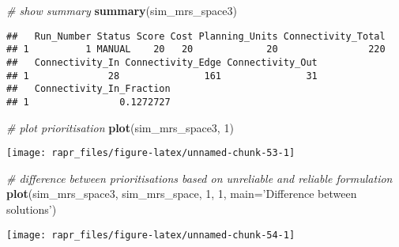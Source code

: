\documentclass[11pt,]{article}
\newenvironment{Shaded}{\begin{snugshade}}{\end{snugshade}}
\newcommand{\KeywordTok}[1]{\textcolor[rgb]{0.13,0.29,0.53}{\textbf{{#1}}}}
\newcommand{\DataTypeTok}[1]{\textcolor[rgb]{0.13,0.29,0.53}{{#1}}}
\newcommand{\DecValTok}[1]{\textcolor[rgb]{0.00,0.00,0.81}{{#1}}}
\newcommand{\StringTok}[1]{\textcolor[rgb]{0.31,0.60,0.02}{{#1}}}
\newcommand{\CommentTok}[1]{\textcolor[rgb]{0.56,0.35,0.01}{\textit{{#1}}}}
\newcommand{\NormalTok}[1]{{#1}}
\let\origfigure\figure
\let\endorigfigure\endfigure
\renewenvironment{figure}[1][2] {
	\expandafter\origfigure\expandafter[H]
} {
	\endorigfigure
}
\begin{document}
\begin{Shaded}
\begin{Highlighting}[]
\CommentTok{# show summary}
\KeywordTok{summary}\NormalTok{(sim_mrs_space3)}
\end{Highlighting}
\end{Shaded}

\begin{verbatim}
##   Run_Number Status Score Cost Planning_Units Connectivity_Total
## 1          1 MANUAL    20   20             20                220
##   Connectivity_In Connectivity_Edge Connectivity_Out
## 1              28               161               31
##   Connectivity_In_Fraction
## 1                0.1272727
\end{verbatim}

\begin{Shaded}
\begin{Highlighting}[]
\CommentTok{# plot prioritisation}
\KeywordTok{plot}\NormalTok{(sim_mrs_space3, }\DecValTok{1}\NormalTok{)}
\end{Highlighting}
\end{Shaded}

\begin{figure}

{\centering \texttt{[image: rapr\_files/figure-latex/unnamed-chunk-53-1]} 

}

\caption{A multi-species prioritisation for the uniformly, normally, and bimodally distributed species generated using amount-based targets (20\%) and space-based targets (85\%). This priorititisation was generated to be robust against low occupancy probabilities, by explicitly using the probability of occupancy data when deriving a solution. See Figure 12 caption for conventions.}\label{fig:unnamed-chunk-53}
\end{figure}

\begin{Shaded}
\begin{Highlighting}[]
\CommentTok{# difference between prioritisations based on unreliable and reliable formulation}
\KeywordTok{plot}\NormalTok{(sim_mrs_space3, sim_mrs_space, }\DecValTok{1}\NormalTok{, }\DecValTok{1}\NormalTok{, }\DataTypeTok{main=}\StringTok{'Difference between solutions'}\NormalTok{)}
\end{Highlighting}
\end{Shaded}

\begin{figure}

{\centering \texttt{[image: rapr\_files/figure-latex/unnamed-chunk-54-1]} 

}

\caption{Difference between two multi-species prioritisations. See Figure 7 caption for conventions.}\label{fig:unnamed-chunk-54}
\end{figure}
\end{document}
